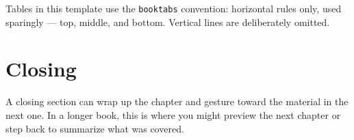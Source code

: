 Tables in this template use the \texttt{booktabs} convention: horizontal rules only, used sparingly --- top, middle, and bottom. Vertical lines are deliberately omitted.


\section{Closing}

A closing section can wrap up the chapter and gesture toward the material in the next one. In a longer book, this is where you might preview the next chapter or step back to summarize what was covered.
